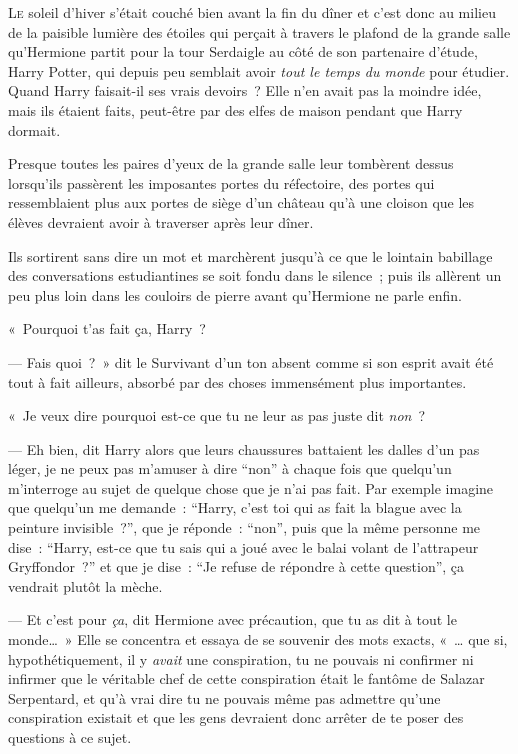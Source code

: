 
\lettrine{L}{e} soleil d'hiver s'était couché bien avant la fin du dîner et c'est donc au milieu de la paisible lumière des étoiles qui perçait à travers le plafond de la grande salle qu'Hermione partit pour la tour Serdaigle au côté de son partenaire d'étude, Harry Potter, qui depuis peu semblait avoir \emph{tout le temps du monde} pour étudier. Quand Harry faisait-il ses vrais devoirs~? Elle n'en avait pas la moindre idée, mais ils étaient faits, peut-être par des elfes de maison pendant que Harry dormait.

Presque toutes les paires d'yeux de la grande salle leur tombèrent dessus lorsqu'ils passèrent les imposantes portes du réfectoire, des portes qui ressemblaient plus aux portes de siège d'un château qu'à une cloison que les élèves devraient avoir à traverser après leur dîner.

Ils sortirent sans dire un mot et marchèrent jusqu'à ce que le lointain babillage des conversations estudiantines se soit fondu dans le silence~; puis ils allèrent un peu plus loin dans les couloirs de pierre avant qu'Hermione ne parle enfin.

«~Pourquoi t'as fait ça, Harry~?

--- Fais quoi~?~» dit le Survivant d'un ton absent comme si son esprit avait été tout à fait ailleurs, absorbé par des choses immensément plus importantes.

«~Je veux dire pourquoi est-ce que tu ne leur as pas juste dit \emph{non}~?

--- Eh bien, dit Harry alors que leurs chaussures battaient les dalles d'un pas léger, je ne peux pas m'amuser à dire “non” à chaque fois que quelqu'un m'interroge au sujet de quelque chose que je n'ai pas fait. Par exemple imagine que quelqu'un me demande~: “Harry, c'est toi qui as fait la blague avec la peinture invisible~?”, que je réponde~: “non”, puis que la même personne me dise~: “Harry, est-ce que tu sais qui a joué avec le balai volant de l'attrapeur Gryffondor~?” et que je dise~: “Je refuse de répondre à cette question”, ça vendrait plutôt la mèche.

--- Et c'est pour \emph{ça}, dit Hermione avec précaution, que tu as dit à tout le monde…~» Elle se concentra et essaya de se souvenir des mots exacts, «~… que si, hypothétiquement, il y \emph{avait} une conspiration, tu ne pouvais ni confirmer ni infirmer que le véritable chef de cette conspiration était le fantôme de Salazar Serpentard, et qu'à vrai dire tu ne pouvais même pas admettre qu'une conspiration existait et que les gens devraient donc arrêter de te poser des questions à ce sujet.


